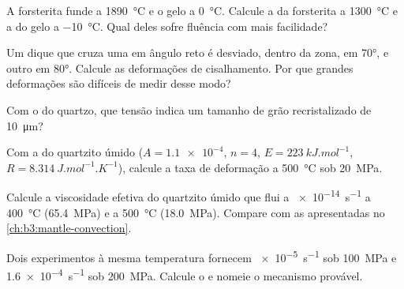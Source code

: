 \begin{exercise}[$\star$]\label{exo:b3:deformation-mechanisms:1}
A forsterita funde a \qty{1890}{\celsius} e o gelo a \qty{0}{\celsius}. Calcule
a  da forsterita a \qty{1300}{\celsius} e a do gelo a
\qty{-10}{\celsius}. Qual deles sofre fluência com mais facilidade?
\end{exercise}

\begin{exercise}[$\star$]\label{exo:b3:deformation-mechanisms:2}
Um dique que cruza uma  em ângulo reto é desviado, dentro da zona, em
\ang{70}, e outro em \ang{80}. Calcule as deformações de cisalhamento. Por que grandes
deformações são difíceis de medir desse modo?
\end{exercise}

\begin{exercise}[$\star$]\label{exo:b3:deformation-mechanisms:3}
Com o  do quartzo, que tensão indica um tamanho de grão recristalizado de
\qty{10}{\micro m}?
\end{exercise}

\begin{exercise}[$\star$]\label{exo:b3:deformation-mechanisms:4}
Com a  do quartzito úmido ($A = \num{1.1e-4}$, $n = 4$, $E =
\qty{223}{kJ.mol^{-1}}$, $R = \qty{8.314}{J.mol^{-1}.K^{-1}}$), calcule a taxa de
deformação a \qty{500}{\celsius} sob \qty{20}{MPa}.
\end{exercise}

\begin{exercise}[$\star\star$]\label{exo:b3:deformation-mechanisms:5}
Calcule a viscosidade efetiva do quartzito úmido que flui a \qty{e-14}{s^{-1}}
a \qty{400}{\celsius} (\qty{65.4}{MPa}) e a \qty{500}{\celsius}
(\qty{18.0}{MPa}). Compare com as  apresentadas no
\cref{ch:b3:mantle-convection}.
\end{exercise}

\begin{exercise}[$\star\star$]\label{exo:b3:deformation-mechanisms:6}
Dois experimentos à mesma temperatura fornecem \qty{e-5}{s^{-1}} sob
\qty{100}{MPa} e \qty{1.6e-4}{s^{-1}} sob \qty{200}{MPa}. Calcule o 
e nomeie o mecanismo provável.
\end{exercise}

